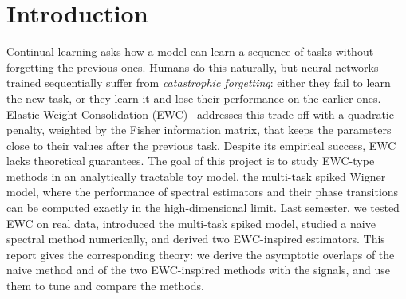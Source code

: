 \section{Introduction}
Continual learning asks how a model can learn a sequence of tasks without forgetting the previous ones. Humans do this naturally, but neural networks trained sequentially suffer from \emph{catastrophic forgetting}: either they fail to learn the new task, or they learn it and lose their performance on the earlier ones. Elastic Weight Consolidation (EWC)~\cite{Kirkpatrick_2017} addresses this trade-off with a quadratic penalty, weighted by the Fisher information matrix, that keeps the parameters close to their values after the previous task. Despite its empirical success, EWC lacks theoretical guarantees. The goal of this project is to study EWC-type methods in an analytically tractable toy model, the multi-task spiked Wigner model, where the performance of spectral estimators and their phase transitions can be computed exactly in the high-dimensional limit. Last semester, we tested EWC on real data, introduced the multi-task spiked model, studied a naive spectral method numerically, and derived two EWC-inspired estimators. This report gives the corresponding theory: we derive the asymptotic overlaps of the naive method and of the two EWC-inspired methods with the signals, and use them to tune and compare the methods.
